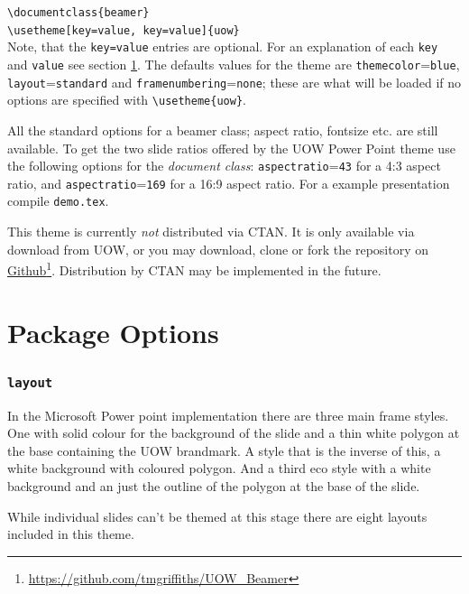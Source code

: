 \documentclass[a4paper,oneside,12pt]{article}
\newcommand{\key}[1]{\texttt{\color{UOWorange}#1}}
\newcommand{\val}[1]{\texttt{\color{UOWblue}#1}}
\newcommand{\command}[1]{\texttt{\color{UOWdarkgreen}#1}}
\begin{document}
\command{\textbackslash{}documentclass\{beamer\}}\\
\command{\textbackslash{}usetheme[\key{key}=\val{value}, \key{key}=\val{value}]\{uow\}}\\

Note, that the \command{\key{key}=\val{value}} entries are optional. For an explanation of each \key{key} and \val{value} see section \ref{sec:options}. The defaults values for the theme are \key{themecolor}=\val{blue}, \key{layout}=\val{standard} and \key{framenumbering}=\val{none}; these are what will be loaded if no options are specified with \command{\textbackslash{}usetheme\{uow\}}. 

All the standard options for a beamer class; aspect ratio, fontsize etc. are still available. To get the two slide ratios offered by the UOW Power Point theme use the following options for the \emph{document class}: \key{aspectratio}=\val{43} for a 4:3 aspect ratio, and \key{aspectratio}=\val{169} for a 16:9 aspect ratio. For a example presentation compile \texttt{demo.tex}.

This theme is currently \emph{not} distributed via CTAN. It is only available via download from UOW, or you may download, clone or fork the repository on \href{https://github.com/tmgriffiths/UOW_Beamer}{Github}\footnote{\url{https://github.com/tmgriffiths/UOW_Beamer}}. Distribution by CTAN may be implemented in the future.

\section{Package Options}\label{sec:options}
\subsubsection*{\key{layout}}%
In the Microsoft Power point implementation there are three main frame styles. One with solid colour for the background of the slide and a thin white polygon at the base containing the UOW brandmark. A style that is the inverse of this, a white background with coloured polygon. And a third eco style with a white background and an just the outline of the polygon at the base of the slide.

While individual slides can't be themed at this stage there are eight layouts included in this theme. 
\end{document}
